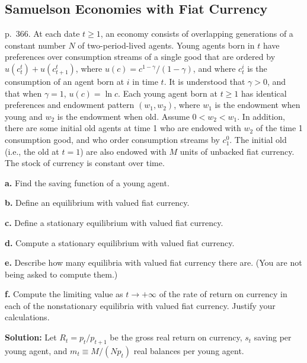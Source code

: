 \documentclass[12pt, letterpaper]{article}
\begin{document}
\subsection{Samuelson Economies with Fiat Currency}

\begin{tcolorbox}[oddbox,title={Exercise 9.1 \quad Samuelson economy, CRRA utility}]
\begin{tcolorbox}[questionbox]
p.~366. At each date $t\ge1$, an economy consists of overlapping generations of a constant number
$N$ of two-period-lived agents. Young agents born in $t$ have preferences over consumption streams of
a single good that are ordered by $u(c_t^t)+u(c_{t+1}^t)$, where $u(c)=c^{1-\gamma}/(1-\gamma)$, and
where $c_t^i$ is the consumption of an agent born at $i$ in time $t$. It is understood that
$\gamma>0$, and that when $\gamma=1$, $u(c)=\ln c$. Each young agent born at $t\ge1$ has identical
preferences and endowment pattern $(w_1,w_2)$, where $w_1$ is the endowment when young and $w_2$ is
the endowment when old. Assume $0<w_2<w_1$. In addition, there are some initial old agents at time 1
who are endowed with $w_2$ of the time 1 consumption good, and who order consumption streams by
$c_1^0$. The initial old (i.e., the old at $t=1$) are also endowed with $M$ units of unbacked fiat
currency. The stock of currency is constant over time.

\textbf{a.} Find the saving function of a young agent.

\textbf{b.} Define an equilibrium with valued fiat currency.

\textbf{c.} Define a stationary equilibrium with valued fiat currency.

\textbf{d.} Compute a stationary equilibrium with valued fiat currency.

\textbf{e.} Describe how many equilibria with valued fiat currency there are. (You are not being
asked to compute them.)

\textbf{f.} Compute the limiting value as $t\to+\infty$ of the rate of return on currency in each of
the nonstationary equilibria with valued fiat currency. Justify your calculations.
\end{tcolorbox}

\textbf{Solution:} Let $R_t=p_t/p_{t+1}$ be the gross real return on currency, $s_t$ saving per young
agent, and $m_t\equiv M/(Np_t)$ real balances per young agent.


\end{tcolorbox}
\end{document}
